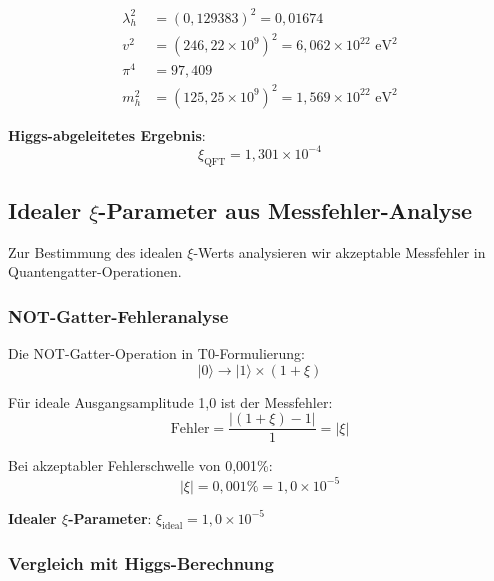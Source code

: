 	\begin{align}
		\lambda_h^2 &= (0,129383)^2 = 0,01674 \\
		v^2 &= (246,22 \times 10^9)^2 = 6,062 \times 10^{22} \text{ eV}^2 \\
		\pi^4 &= 97,409 \\
		m_h^2 &= (125,25 \times 10^9)^2 = 1,569 \times 10^{22} \text{ eV}^2
	\end{align}
	
	\textbf{Higgs-abgeleitetes Ergebnis}:
	\begin{equation}
		\xi_{\text{QFT}} = 1{,}301 \times 10^{-4}
	\end{equation}
	
	\subsection{Idealer $\xi$-Parameter aus Messfehler-Analyse}
	
	Zur Bestimmung des idealen $\xi$-Werts analysieren wir akzeptable Messfehler in Quantengatter-Operationen.
	
	\subsubsection{NOT-Gatter-Fehleranalyse}
	
	Die NOT-Gatter-Operation in T0-Formulierung:
	\begin{equation}
		|0\rangle \rightarrow |1\rangle \times (1 + \xi)
	\end{equation}
	
	Für ideale Ausgangsamplitude 1,0 ist der Messfehler:
	\begin{equation}
		\text{Fehler} = \frac{|(1 + \xi) - 1|}{1} = |\xi|
	\end{equation}
	
	Bei akzeptabler Fehlerschwelle von 0,001\%:
	\begin{equation}
		|\xi| = 0,001\% = 1,0 \times 10^{-5}
	\end{equation}
	
	\textbf{Idealer $\xi$-Parameter}: $\xi_{\text{ideal}} = 1,0 \times 10^{-5}$
	
	\subsubsection{Vergleich mit Higgs-Berechnung}
	
	\begin{table}[htbp]
		\centering
		\caption{$\xi$-Parameter-Quellen-Vergleich}
	\end{table}
	
